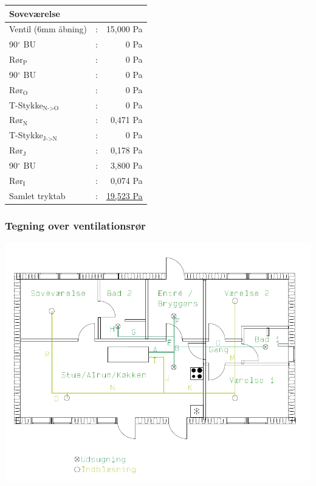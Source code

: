 \begin{table}[h!]
    \begin{center}
       \begin{tabular}{lcr}
           \hline
           \hline
           \textbf{Soveværelse} &  & \\
           \hline
           \hline
           Ventil (6mm åbning) & : & 15,000 Pa \\
           90$^\circ$ BU    & : & 0 Pa \\
           Rør$_{\text{P}}$ & : & 0 Pa \\
           90$^\circ$ BU    & : & 0 Pa \\
           Rør$_{\text{O}}$ & : & 0 Pa \\
           T-Stykke$_{\text{N->O}}$  & : & 0 Pa\\
           Rør$_{\text{N}}$ & : & 0,471 Pa \\
           T-Stykke$_{\text{J->N}}$  & : & 0 Pa\\
           Rør$_{\text{J}}$ & : & 0,178 Pa \\
           90$^\circ$ BU    & : & 3,800 Pa \\
           Rør$_{\text{I}}$ & : & 0,074 Pa \\
           \hline
           Samlet tryktab & : & \underline{\underline{ 19,523 Pa}} 
       \end{tabular}
   \end{center}
\end{table}



\subsubsection{Tegning over ventilationsrør} \label{fig:tegning_ventr}
\includegraphics[scale=0.60,angle=90,origin=c]{appendix/ventilation/ventilation_tegning.png}%